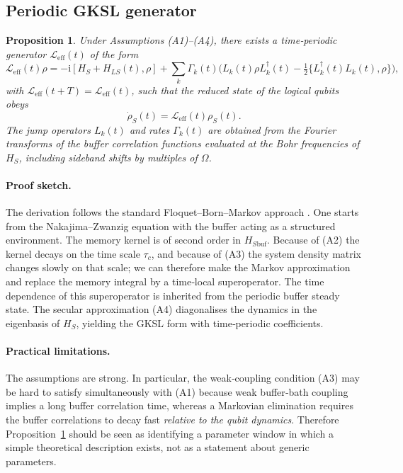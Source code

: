 \documentclass[11pt,a4paper]{article}
\theoremstyle{plain}
\newtheorem{proposition}{Proposition}[section]
\theoremstyle{definition}
\theoremstyle{remark}
\newcommand{\ii}{\mathrm{i}}
\begin{document}
\subsection{Periodic GKSL generator}
\begin{proposition}\label{prop:periodic}
Under Assumptions (A1)–(A4), there exists a time‑periodic generator $\mathcal{L}_{\text{eff}}(t)$ of the form
\begin{equation}
\mathcal{L}_{\text{eff}}(t)\rho = -\ii[H_S + H_{LS}(t), \rho] + \sum_k \Gamma_k(t) \Big( L_k(t) \rho L_k^\dagger(t) - \tfrac12\{ L_k^\dagger(t)L_k(t),\rho \} \Big),
\end{equation}
with $\mathcal{L}_{\text{eff}}(t+T)=\mathcal{L}_{\text{eff}}(t)$, such that the reduced state of the logical qubits obeys
\begin{equation}\label{eq:periodic_dyn}
\dot\rho_S(t) = \mathcal{L}_{\text{eff}}(t)\rho_S(t).
\end{equation}
The jump operators $L_k(t)$ and rates $\Gamma_k(t)$ are obtained from the Fourier transforms of the buffer correlation functions evaluated at the Bohr frequencies of $H_S$, including sideband shifts by multiples of $\Omega$.
\end{proposition}

\paragraph{Proof sketch.}
The derivation follows the standard Floquet–Born–Markov approach \cite{Kurizki2015}. One starts from the Nakajima–Zwanzig equation with the buffer acting as a structured environment. The memory kernel is of second order in $H_{S\text{buf}}$. Because of (A2) the kernel decays on the time scale $\tau_c$, and because of (A3) the system density matrix changes slowly on that scale; we can therefore make the Markov approximation and replace the memory integral by a time‑local superoperator. The time dependence of this superoperator is inherited from the periodic buffer steady state. The secular approximation (A4) diagonalises the dynamics in the eigenbasis of $H_S$, yielding the GKSL form with time‑periodic coefficients.

\paragraph{Practical limitations.}
The assumptions are strong. In particular, the weak‑coupling condition (A3) may be hard to satisfy simultaneously with (A1) because weak buffer‑bath coupling implies a long buffer correlation time, whereas a Markovian elimination requires the buffer correlations to decay fast \emph{relative to the qubit dynamics}. Therefore Proposition~\ref{prop:periodic} should be seen as identifying a parameter window in which a simple theoretical description exists, not as a statement about generic parameters.
\end{document}
